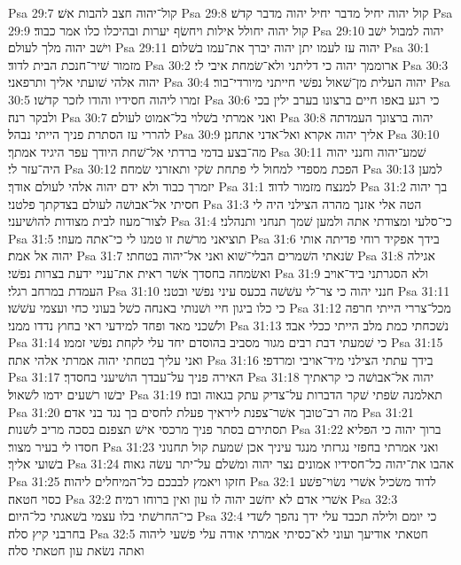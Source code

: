 Psa 29:7  קול־יהוה חצב להבות אשׁ׃
Psa 29:8  קול יהוה יחיל מדבר יחיל יהוה מדבר קדשׁ׃
Psa 29:9  קול יהוה יחולל אילות ויחשׂף יערות ובהיכלו כלו אמר כבוד׃
Psa 29:10  יהוה למבול ישׁב וישׁב יהוה מלך לעולם׃
Psa 29:11  יהוה עז לעמו יתן יהוה יברך את־עמו בשׁלום׃
Psa 30:1  מזמור שׁיר־חנכת הבית לדוד׃
Psa 30:2  ארוממך יהוה כי דליתני ולא־שׂמחת איבי לי׃
Psa 30:3  יהוה אלהי שׁועתי אליך ותרפאני׃
Psa 30:4  יהוה העלית מן־שׁאול נפשׁי חייתני מיורדי־בור׃
Psa 30:5  זמרו ליהוה חסידיו והודו לזכר קדשׁו׃
Psa 30:6  כי רגע באפו חיים ברצונו בערב ילין בכי ולבקר רנה׃
Psa 30:7  ואני אמרתי בשׁלוי בל־אמוט לעולם׃
Psa 30:8  יהוה ברצונך העמדתה להררי עז הסתרת פניך הייתי נבהל׃
Psa 30:9  אליך יהוה אקרא ואל־אדני אתחנן׃
Psa 30:10  מה־בצע בדמי ברדתי אל־שׁחת היודך עפר היגיד אמתך׃
Psa 30:11  שׁמע־יהוה וחנני יהוה היה־עזר לי׃
Psa 30:12  הפכת מספדי למחול לי פתחת שׂקי ותאזרני שׂמחה׃
Psa 30:13  למען יזמרך כבוד ולא ידם יהוה אלהי לעולם אודך׃
Psa 31:1  למנצח מזמור לדוד׃
Psa 31:2  בך יהוה חסיתי אל־אבושׁה לעולם בצדקתך פלטני׃
Psa 31:3  הטה אלי אזנך מהרה הצילני היה לי לצור־מעוז לבית מצודות להושׁיעני׃
Psa 31:4  כי־סלעי ומצודתי אתה ולמען שׁמך תנחני ותנהלני׃
Psa 31:5  תוציאני מרשׁת זו טמנו לי כי־אתה מעוזי׃
Psa 31:6  בידך אפקיד רוחי פדיתה אותי יהוה אל אמת׃
Psa 31:7  שׂנאתי השׁמרים הבלי־שׁוא ואני אל־יהוה בטחתי׃
Psa 31:8  אגילה ואשׂמחה בחסדך אשׁר ראית את־עניי ידעת בצרות נפשׁי׃
Psa 31:9  ולא הסגרתני ביד־אויב העמדת במרחב רגלי׃
Psa 31:10  חנני יהוה כי צר־לי עשׁשׁה בכעס עיני נפשׁי ובטני׃
Psa 31:11  כי כלו ביגון חיי ושׁנותי באנחה כשׁל בעוני כחי ועצמי עשׁשׁו׃
Psa 31:12  מכל־צררי הייתי חרפה ולשׁכני מאד ופחד למידעי ראי בחוץ נדדו ממני׃
Psa 31:13  נשׁכחתי כמת מלב הייתי ככלי אבד׃
Psa 31:14  כי שׁמעתי דבת רבים מגור מסביב בהוסדם יחד עלי לקחת נפשׁי זממו׃
Psa 31:15  ואני עליך בטחתי יהוה אמרתי אלהי אתה׃
Psa 31:16  בידך עתתי הצילני מיד־אויבי ומרדפי׃
Psa 31:17  האירה פניך על־עבדך הושׁיעני בחסדך׃
Psa 31:18  יהוה אל־אבושׁה כי קראתיך יבשׁו רשׁעים ידמו לשׁאול׃
Psa 31:19  תאלמנה שׂפתי שׁקר הדברות על־צדיק עתק בגאוה ובוז׃
Psa 31:20  מה רב־טובך אשׁר־צפנת ליראיך פעלת לחסים בך נגד בני אדם׃
Psa 31:21  תסתירם בסתר פניך מרכסי אישׁ תצפנם בסכה מריב לשׁנות׃
Psa 31:22  ברוך יהוה כי הפליא חסדו לי בעיר מצור׃
Psa 31:23  ואני אמרתי בחפזי נגרזתי מנגד עיניך אכן שׁמעת קול תחנוני בשׁועי אליך׃
Psa 31:24  אהבו את־יהוה כל־חסידיו אמונים נצר יהוה ומשׁלם על־יתר עשׂה גאוה׃
Psa 31:25  חזקו ויאמץ לבבכם כל־המיחלים ליהוה׃
Psa 32:1  לדוד משׂכיל אשׁרי נשׂוי־פשׁע כסוי חטאה׃
Psa 32:2  אשׁרי אדם לא יחשׁב יהוה לו עון ואין ברוחו רמיה׃
Psa 32:3  כי־החרשׁתי בלו עצמי בשׁאגתי כל־היום׃
Psa 32:4  כי יומם ולילה תכבד עלי ידך נהפך לשׁדי בחרבני קיץ סלה׃
Psa 32:5  חטאתי אודיעך ועוני לא־כסיתי אמרתי אודה עלי פשׁעי ליהוה ואתה נשׂאת עון חטאתי סלה׃
